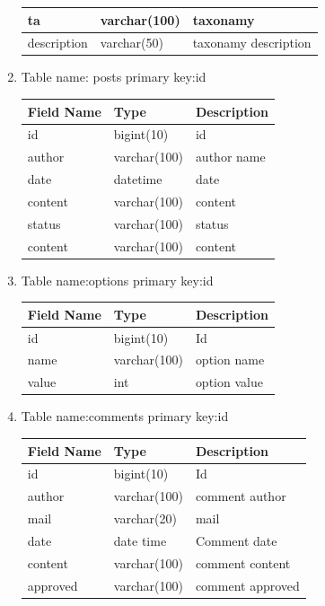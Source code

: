 \documentclass[a4paper,12pt]{article}
\begin{document}
\begin{enumerate}
\begin{tabular}{|l|l|l|}
\hline ta&varchar(100)&taxonamy\\
\hline
description&varchar(50)&taxonamy description\\
\hline

 \end{tabular}
\newpage
\vspace{5mm}
\item Table name: posts
\newline primary key:id
\vspace{5mm}\newline
\begin{tabular}{|l|l|l|} 
\hline
Field Name&Type&Description\\
 \hline 
id&bigint(10)&id\\
\hline author &varchar(100)&author name\\
\hline
date&datetime&date\\
\hline
content&varchar(100)&content\\
\hline
status&varchar(100)&status\\
\hline
content&varchar(100)&content\\
\hline
 \end{tabular}

\vspace{5mm}
\item  Table name:options
\newline primary key:id
\vspace{5mm}\newline
\begin{tabular}{|l|l|l|} 
\hline
Field Name& Type&Description\\
 \hline 
id&bigint(10)&Id\\
\hline 
name&varchar(100)&option name\\
\hline
value&int&option value\\
\hline

 \end{tabular}
\vspace{5mm}
\item  Table name:comments
\newline primary key:id
\vspace{5mm}\newline
\begin{tabular}{|l|l|l|} 
\hline
Field Name&Type&Description\\
 \hline 
id&bigint(10)&Id\\
\hline 
author&varchar(100)&comment author\\
\hline
mail&varchar(20)&mail\\
\hline
date&date time&Comment date\\
\hline
content&varchar(100)&comment content\\
\hline
approved&varchar(100)&comment approved\\
\hline
 \end{tabular}

\end{enumerate}
\newpage
\end{document}
